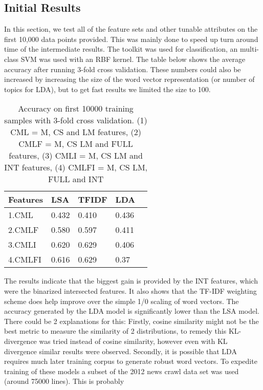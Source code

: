 \documentclass[11pt]{article}
\begin{document}
\subsection{Initial Results}
In this section, we test all of the feature sets and other tunable attributes on
the first 10,000 data points provided. This was mainly done to speed up turn
around time of the intermediate results. The \cite{scikit-learn} toolkit was used for
classification, an multi-class SVM was used with an RBF kernel. 
The table below shows the average accuracy after running 3-fold cross validation. 
These numbers could also be increased by increasing the size of the word vector 
representation (or number of topics for LDA), but to get fast results we limited the size to 100.
\begin{table}[h]
\begin{center}
\begin{singlespace}
\begin{tabular}{|l|l|l|l|l|}
\hline \bf Features & \bf LSA & \bf TFIDF  & \bf LDA \\ \hline
1.CML &0.432& 0.410 & 0.436\\
2.CMLF &0.580 & 0.597&0.411\\
3.CMLI & 0.620 & 0.629&0.406\\
4.CMLFI&0.616& 0.629&0.37 \\
\hline
\end{tabular}
\end{singlespace}
\end{center}
\caption{ Accuracy on first 10000 training samples with 3-fold cross validation.
  (1) CML = M, CS and LM features, 
  (2) CMLF = M, CS LM and FULL features,
  (3) CMLI = M, CS LM and INT features,
  (4) CMLFI = M, CS LM, FULL and INT}
\end{table}
The results indicate that the biggest gain is provided by the INT features,
which were the binarized intersected features. It also shows that the TF-IDF
weighting scheme does help improve over the simple 1/0 scaling of word vectors.
The accuracy generated by the LDA model is significantly lower than the LSA
model. There could be 2 explanations for this: Firstly, cosine similarity might
not be the best metric to measure the similarity of 2 distributions, to remedy this
KL-divergence was tried instead of cosine similarity, however even with KL
divergence similar results were observed. Secondly, it is possible that LDA requires much later training corpus
to generate robust word vectors. To expedite training of these models a subset
of the 2012 news crawl data set was used (around 75000 lines). This is probably
\end{document}
